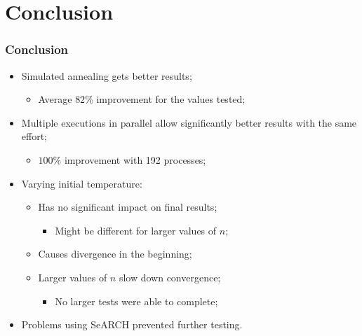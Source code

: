 \section{Conclusion}
\label{sec:conclusion}

\begin{frame}
	\frametitle{Conclusion}
	\begin{itemize}
		\vfill
		\item{Simulated annealing gets better results;
		\begin{itemize}
			\item{Average $82\%$ improvement for the values tested;}
		\end{itemize}
		}
		\vfill
		\item{Multiple executions in parallel allow significantly better results with the same effort;
		\begin{itemize}
			\item{$100\%$ improvement with 192 processes;}
		\end{itemize}
		}
		\vfill
		\item{Varying initial temperature:
		\begin{itemize}
			\item{Has no significant impact on final results;
			\begin{itemize}
				\item{Might be different for larger values of $n$;}
			\end{itemize}
			}
			\item{Causes divergence in the beginning;}
			\item{Larger values of $n$ slow down convergence;
			\begin{itemize}
				\item{No larger tests were able to complete;}
			\end{itemize}
			}
		\end{itemize}
		}
		\vfill
		\item{Problems using SeARCH prevented further testing.}
		\vfill
	\end{itemize}
\end{frame}